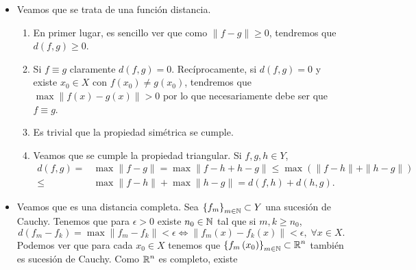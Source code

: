 \documentclass{article}
\begin{document}
\begin{sol}
\begin{itemize}
		Como $\displaystyle f\left(X\right)\subset \R^{n} $ es compacto, tendremos que es cerrado y acotado. En concreto, la función $\displaystyle h = \|f-g\| : X \to \R $ es continua por lo que $\displaystyle h\left(X\right) $ es un compacto de $\displaystyle \R $. Así, existen $\displaystyle \alpha = \inf h\left(X\right) $ y $\displaystyle \beta = \sup h\left(X\right) $ y como $\displaystyle h\left(X\right) $ es cerrado y acotado se tiene que 
		\[\alpha, \beta \in \overline{h\left(X\right)}=h\left(X\right) .\]
		Por tanto, la función $\displaystyle h = \|f-g\| $ alcanza su máximo en $\displaystyle X $ y tenemos que la función distancia dada en el enunciado está bien definida.
	\item Veamos que se trata de una función distancia. 
		\begin{enumerate}
		\item En primer lugar, es sencillo ver que como $\displaystyle \|f-g\| \geq 0 $, tendremos que $\displaystyle d\left(f,g\right) \geq 0 $.
		\item Si $\displaystyle f \equiv g $ claramente $\displaystyle d\left(f,g\right)=0 $. Recíprocamente, si $\displaystyle d\left(f,g\right)=0 $ y existe $\displaystyle x_{0} \in X $ con $\displaystyle f\left(x_{0}\right)\neq g\left(x_{0}\right) $, tendremos que $\displaystyle \max \|f\left(x\right)-g\left(x\right)\| > 0 $ por lo que necesariamente debe ser que $\displaystyle f \equiv g $.
		\item Es trivial que la propiedad simétrica se cumple.
		\item Veamos que se cumple la propiedad triangular. Si $\displaystyle f,g,h \in Y $,
			\[
			\begin{split}
				d\left(f,g\right)= &\max \|f-g\|=\max \|f-h+h-g\|\leq \max \left(\|f-h\| + \|h-g\|\right) \\
				\leq& \max \|f-h\| + \max \|h - g\| = d\left(f,h\right) + d\left(h,g\right) .
			\end{split}
			\]
		\end{enumerate}
	\item Veamos que es una distancia completa. Sea $\displaystyle \left\{ f_{m}\right\} _{m\in\mathbb{N}}\subset Y $ una sucesión de Cauchy. Tenemos que para $\displaystyle \epsilon > 0 $ existe $\displaystyle n_{0} \in \mathbb{N} $ tal que si $\displaystyle m,k\geq n_{0} $,
		\[d\left(f_{m}-f_{k}\right)=\max \|f_{m}-f_{k}\|<\epsilon \iff \|f_{m}\left(x\right)-f_{k}\left(x\right)\|<\epsilon, \; \forall x \in X .\]
		Podemos ver que para cada $\displaystyle x_{0} \in X $ tenemos que $\displaystyle \left\{ f_{m}\left(x_{0}\right)\right\} _{m \in \mathbb{N}} \subset \mathbb{R}^{n} $ también es sucesión de Cauchy. Como $\displaystyle \mathbb{R}^{n} $ es completo, existe 

\end{itemize}
\end{sol}
\end{document}
